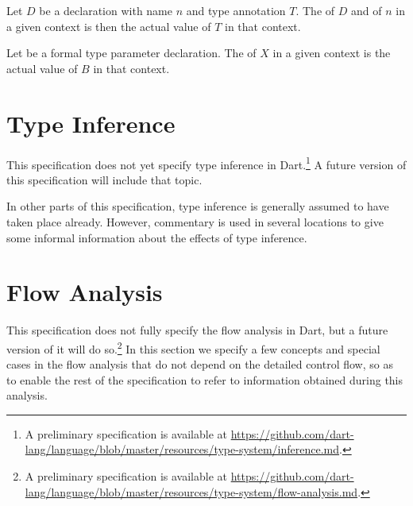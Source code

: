 \documentclass[makeidx]{article}
\begin{document}
{\LMHash{}%
Let $D$ be a declaration with name $n$ and type annotation $T$.
The  of $D$ and of $n$ in a given context is
then the actual value of $T$ in that context.


\LMHash{}%
Let  be a formal type parameter declaration.
The  of $X$ in a given context is
the actual value of $B$ in that context.



\section{Type Inference}

\LMHash{}%
This specification does not yet specify type inference in Dart.\!\footnote{%
A preliminary specification is available at
\url{https://github.com/dart-lang/language/blob/master/resources/type-system/inference.md}.%
}
A future version of this specification will include that topic.

\LMHash{}%
In other parts of this specification,
type inference is generally assumed to have taken place already.
However, commentary is used in several locations to give some informal
information about the effects of type inference.


\section{Flow Analysis}

\LMHash{}%
This specification does not fully specify the flow analysis in Dart,
but a future version of it will do so.\!\footnote{%
A preliminary specification is available at
\url{https://github.com/dart-lang/language/blob/master/resources/type-system/flow-analysis.md}.%
}
In this section we specify a few concepts and special cases
in the flow analysis
that do not depend on the detailed control flow,
so as to enable the rest of the specification to refer to information
obtained during this analysis.

}
\end{document}
